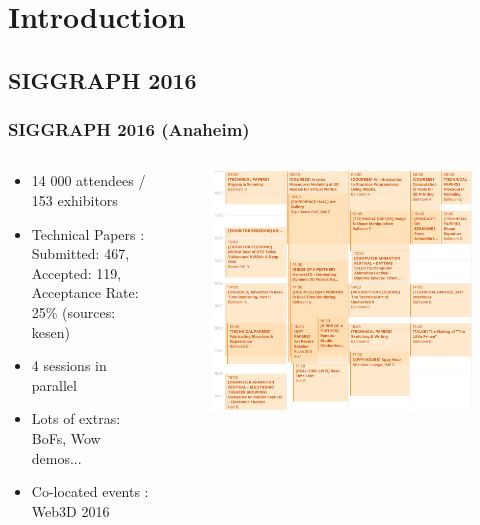 \section{Introduction}
\subsection{SIGGRAPH 2016}
\frame
{
	\frametitle{SIGGRAPH 2016 (Anaheim)}
	\begin{minipage}[0.2\textheight]{\textwidth}
  				\begin{columns}[T]
  					\begin{column}{0.6\textwidth}
    			\begin{itemize}
    				\item 14 000 attendees / 153 exhibitors 
    				\item Technical Papers :\\ Submitted: 467, Accepted: 119, Acceptance Rate: 25\% (sources: kesen)
    				\item 4 sessions in parallel
    				\item Lots of extras: BoFs, Wow demos...
    				\item Co-located events : Web3D 2016 
    			\end{itemize}
  					\end{column}
  					\begin{column}{0.4\textwidth}  			
  						\begin{figure}
  							\centering
  							\includegraphics[width=\textwidth]{img/cal2.png}
  						\end{figure}
  					\end{column}
  				\end{columns}
  			\end{minipage}
}
